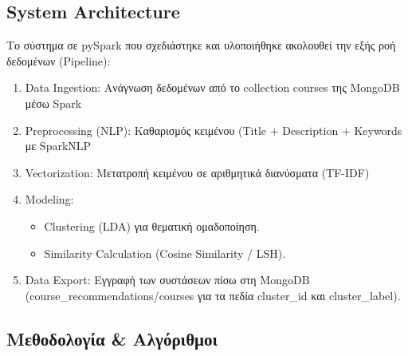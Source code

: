 \documentclass[a4paper,12pt]{article}
\begin{document}
\subsection{System Architecture}
Το σύστημα σε pySpark που σχεδιάστηκε και υλοποιήθηκε ακολουθεί την εξής ροή δεδομένων (Pipeline):
\begin{enumerate}
    \item Data Ingestion: Ανάγνωση δεδομένων από το collection courses της MongoDB μέσω Spark
    \item Preprocessing (NLP): Καθαρισμός κειμένου (Title + Description + Keywords με SparkNLP
    \item Vectorization: Μετατροπή κειμένου σε αριθμητικά διανύσματα (TF-IDF)
    \item Modeling:
    \begin{itemize}
        \item Clustering (LDA) για θεματική ομαδοποίηση.
        \item Similarity Calculation (Cosine Similarity / LSH).
    \end{itemize}
    \item Data Export: Εγγραφή των συστάσεων πίσω στη MongoDB (course\_recommendations/courses για τα πεδία cluster\_id και cluster\_label).
\end{enumerate}

\subsection{Μεθοδολογία \& Αλγόριθμοι}
\end{document}
